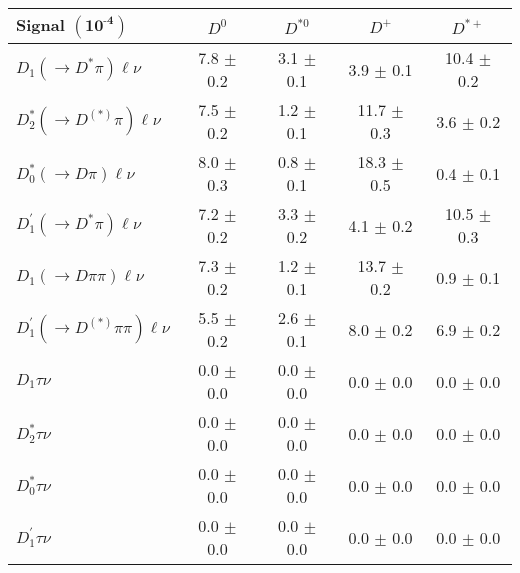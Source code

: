 \begin{tabular}{|l||c|c|c|c|}
\hline
\bf{Signal }$\boldsymbol{(10^{\mbox{-}4})}$ & $D^0$ & $D^{*0}$ & $D^+$ & $D^{*+}$ \\
\hline \hline
$D_1(\to D^*\pi)\ell\nu$ & 7.8 $\pm$ 0.2 & 3.1 $\pm$ 0.1 & 3.9 $\pm$ 0.1 & 10.4 $\pm$ 0.2 \\
$D_2^*(\to D^{(*)}\pi)\ell\nu$ & 7.5 $\pm$ 0.2 & 1.2 $\pm$ 0.1 & 11.7 $\pm$ 0.3 & 3.6 $\pm$ 0.2 \\
$D_0^*(\to D\pi)\ell\nu$ & 8.0 $\pm$ 0.3 & 0.8 $\pm$ 0.1 & 18.3 $\pm$ 0.5 & 0.4 $\pm$ 0.1 \\
$D_1^{'}(\to D^*\pi)\ell\nu$ & 7.2 $\pm$ 0.2 & 3.3 $\pm$ 0.2 & 4.1 $\pm$ 0.2 & 10.5 $\pm$ 0.3 \\
\hline
$D_1(\to D\pi\pi)\ell\nu$ & 7.3 $\pm$ 0.2 & 1.2 $\pm$ 0.1 & 13.7 $\pm$ 0.2 & 0.9 $\pm$ 0.1 \\
$D_1^{'}(\to D^{(*)}\pi\pi)\ell\nu$ & 5.5 $\pm$ 0.2 & 2.6 $\pm$ 0.1 & 8.0 $\pm$ 0.2 & 6.9 $\pm$ 0.2 \\
\hline
$D_1\tau\nu$ & 0.0 $\pm$ 0.0 & 0.0 $\pm$ 0.0 & 0.0 $\pm$ 0.0 & 0.0 $\pm$ 0.0 \\
$D_2^*\tau\nu$ & 0.0 $\pm$ 0.0 & 0.0 $\pm$ 0.0 & 0.0 $\pm$ 0.0 & 0.0 $\pm$ 0.0 \\
$D_0^*\tau\nu$ & 0.0 $\pm$ 0.0 & 0.0 $\pm$ 0.0 & 0.0 $\pm$ 0.0 & 0.0 $\pm$ 0.0 \\
$D_1^{'}\tau\nu$ & 0.0 $\pm$ 0.0 & 0.0 $\pm$ 0.0 & 0.0 $\pm$ 0.0 & 0.0 $\pm$ 0.0 \\
\hline \end{tabular}
\,\,

